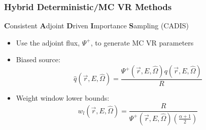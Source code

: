 \documentclass{beamer}
\begin{document}

\begin{frame}
	\frametitle{Hybrid Deterministic/MC VR Methods}
  {\textbf{C}onsistent \textbf{A}djoint \textbf{D}riven
	\textbf{I}mportance \textbf{S}ampling (CADIS) \cite{cadis}}
  \begin{itemize}
  \item{Use the adjoint flux, $\Psi^+$, to generate MC VR parameters}
  \item{Biased source:}
\begin{equation} \label{eq:3.8}
	\widehat{q}(\overrightarrow{r}, E, \widehat{\Omega}) =
	\frac{\Psi^{+}(\overrightarrow{r}, E,\widehat{\Omega})
	q(\overrightarrow{r}, E, \widehat{\Omega})}{R}
\end{equation}

  \item{Weight window lower bounds:}
\begin{equation} \label{eq:3.12}
	w_{l}(\overrightarrow{r}, E, \widehat{\Omega}) = 
	\frac{R}{\Psi^{+}(\overrightarrow{r}, E, \widehat{\Omega})
	(\frac{\alpha + 1}{2})}
\end{equation}
  \end{itemize}
\end{frame}
\end{document}
